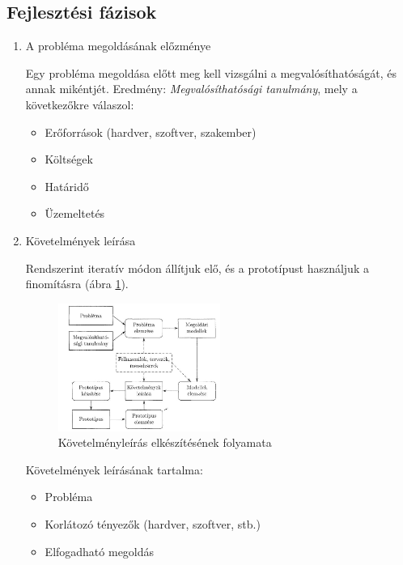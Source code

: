 \documentclass[margin=0px]{article}
\begin{document}
\subsection{Fejlesztési fázisok}
\begin{enumerate}
    \item A probléma megoldásának előzménye

          Egy probléma megoldása előtt meg kell vizsgálni a megvalósíthatóságát, és annak mikéntjét. Eredmény: \textit{Megvalósíthatósági tanulmány}, mely a következőkre válaszol:
          \begin{itemize}
              \item Erőforrások (hardver, szoftver, szakember)
              \item Költségek
              \item Határidő
              \item Üzemeltetés
          \end{itemize}
    \item Követelmények leírása

          Rendszerint iteratív módon állítjuk elő, és a prototípust használjuk a finomításra (ábra \ref{fig:kovetelmenyleiras}).

          \begin{figure}[H]
              \centering
              \includegraphics[width=0.5\textwidth]{img/kovetelmenyleiras.png}
              \caption{Követelményleírás elkészítésének folyamata}
              \label{fig:kovetelmenyleiras}
          \end{figure}

          Követelmények leírásának tartalma:

          \begin{itemize}
              \item Probléma
              \item Korlátozó tényezők (hardver, szoftver, stb.)
              \item Elfogadható megoldás
          \end{itemize}


\end{enumerate}
\end{document}
